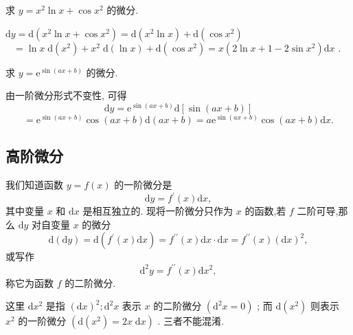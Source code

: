 \begin{example}
求 \(y = {x}^{2}\ln x + \cos {x}^{2}\) 的微分.
\end{example}


\begin{solution}
\(\mathrm{d}y = \mathrm{d}\left( {{x}^{2}\ln x + \cos {x}^{2}}\right)  = \mathrm{d}\left( {{x}^{2}\ln x}\right)  + \mathrm{d}\left( {\cos {x}^{2}}\right)\)
\[
= \ln x\mathrm{\;d}\left( {x}^{2}\right)  + {x}^{2}\mathrm{\;d}\left( {\ln x}\right)  + \mathrm{d}\left( {\cos {x}^{2}}\right)  = x\left( {2\ln x + 1 - 2\sin {x}^{2}}\right) \mathrm{d}x\text{ . }
\]
\end{solution}

\begin{example}
求 \(y = {\mathrm{e}}^{\sin \left( {{ax} + b}\right) }\) 的微分.

\end{example}

\begin{solution}
由一阶微分形式不变性, 可得
\[
\mathrm{d}y = {\mathrm{e}}^{\sin \left( {{ax} + b}\right) }\mathrm{d}\left\lbrack  {\sin \left( {{ax} + b}\right) }\right\rbrack
\]
\[
= {\mathrm{e}}^{\sin \left( {{ax} + b}\right) }\cos \left( {{ax} + b}\right) \mathrm{d}\left( {{ax} + b}\right)  = a{\mathrm{e}}^{\sin \left( {{ax} + b}\right) }\cos \left( {{ax} + b}\right) \mathrm{d}x. \tag{0}
\]
\end{solution}

\subsection{高阶微分}

我们知道函数 \(y = f\left( x\right)\) 的一阶微分是
\[
\mathrm{d}y = {f}^{\prime }\left( x\right) \mathrm{d}x,
\]
其中变量 \(x\) 和 \(\mathrm{d}x\) 是相互独立的. 现将一阶微分只作为 \(x\) 的函数,若 \(f\) 二阶可导,那么 \(\mathrm{d}y\) 对自变量 \(x\) 的微分
\[
\mathrm{d}\left( {\mathrm{d}y}\right)  = \mathrm{d}\left( {{f}^{\prime }\left( x\right) \mathrm{d}x}\right)  = {f}^{\prime \prime }\left( x\right) \mathrm{d}x \cdot  \mathrm{d}x = {f}^{\prime \prime }\left( x\right) {\left( \mathrm{d}x\right) }^{2},
\]
或写作
\[
{\mathrm{d}}^{2}y = {f}^{\prime \prime }\left( x\right) \mathrm{d}{x}^{2}, \tag{5}
\]
称它为函数 \(f\) 的二阶微分.

\begin{remark}
这里 \(\mathrm{d}{x}^{2}\) 是指 \({\left( \mathrm{d}x\right) }^{2};{\mathrm{d}}^{2}x\) 表示 \(x\) 的二阶微分 \(\left( {{\mathrm{d}}^{2}x = 0}\right)\) ; 而 \(\mathrm{d}\left( {x}^{2}\right)\) 则表示 \({x}^{2}\) 的一阶微分 \(\left( {\mathrm{d}\left( {x}^{2}\right)  = {2x}\mathrm{\;d}x}\right)\) . 三者不能混淆.
\end{remark}


